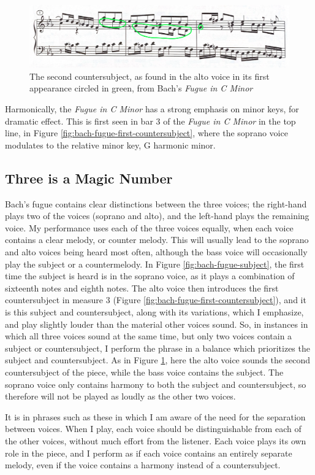 \begin{figure}
    \centering
    \includegraphics[width=\textwidth]{figures/bach-fugue-second-countersubject.jpg}
    \caption{The second countersubject, as found in the alto voice in its first appearance circled in green, from Bach's \textit{Fugue in C Minor}}
    \label{fig:bach-fugue-second-countersubject}
\end{figure}

Harmonically, the \textit{Fugue in C Minor} has a strong emphasis on minor keys, for dramatic effect. This is first seen in bar 3 of the \textit{Fugue in C Minor} in the top line, in Figure \ref{fig:bach-fugue-first-countersubject}\autocite{Henle_2009}, where the soprano voice modulates to the relative minor key, G harmonic minor. 

\subsection{Three is a Magic Number}

Bach's fugue contains clear distinctions between the three voices; the right-hand plays two of the voices (soprano and alto), and the left-hand plays the remaining voice. My performance uses each of the three voices equally, when each voice contains a clear melody, or counter melody. This will usually lead to the soprano and alto voices being heard most often, although the bass voice will occasionally play the subject or a countermelody. In Figure \ref{fig:bach-fugue-subject}\autocite{Henle_2009}, the first time the subject is heard is in the soprano voice, as it plays a combination of sixteenth notes and eighth notes. The alto voice then introduces the first countersubject in measure 3 (Figure \ref{fig:bach-fugue-first-countersubject}\autocite{Henle_2009}), and it is this subject and countersubject, along with its variations, which I emphasize, and play slightly louder than the material other voices sound. So, in instances in which all three voices sound at the same time, but only two voices contain a subject or countersubject, I perform the phrase in a balance which prioritizes the subject and countersubject. As in Figure \ref{fig:bach-fugue-second-countersubject}\autocite{Henle_2009}, here the alto voice sounds the second countersubject of the piece, while the bass voice contains the subject. The soprano voice only contains harmony to both the subject and countersubject, so therefore will not be played as loudly as the other two voices. 

It is in phrases such as these in which I am aware of the need for the separation between voices. When I play, each voice should be distinguishable from each of the other voices, without much effort from the listener. Each voice plays its own role in the piece, and I perform as if each voice contains an entirely separate melody, even if the voice contains a harmony instead of a countersubject. 

